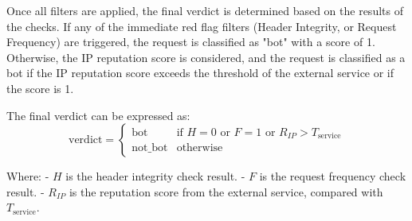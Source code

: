\documentclass[12pt,a4paper]{article}
\begin{document}
Once all filters are applied, the final verdict is determined based on the results of the checks. If any of the immediate red flag filters (Header Integrity, or Request Frequency) are triggered, the request is classified as "bot" with a score of 1. Otherwise, the IP reputation score is considered, and the request is classified as a bot if the IP reputation score exceeds the threshold of the external service or if the score is 1. 

The final verdict can be expressed as:
\[
\text{verdict} = 
\begin{cases} 
\text{bot} & \text{if } H = 0 \text{ or } F = 1 \text{ or } R_{IP} > T_{\text{service}} \\
\text{not\_bot} & \text{otherwise}
\end{cases}
\]

Where: \newline
- \( H \) is the header integrity check result. \newline
- \( F \) is the request frequency check result. \newline
- \( R_{IP} \) is the reputation score from the external service, compared with \( T_{\text{service}} \).
\end{document}
